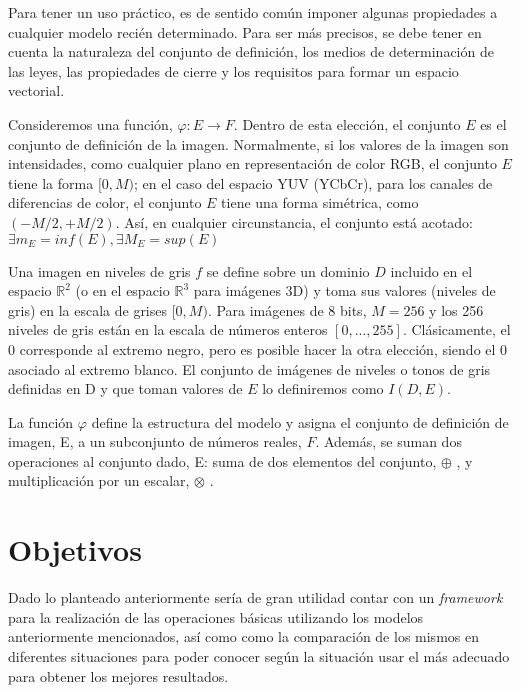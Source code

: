 Para tener un uso práctico, es de sentido común imponer algunas propiedades a cualquier modelo recién determinado. Para ser más precisos, se debe tener en cuenta la naturaleza del conjunto de definición, los medios de determinación de las leyes, las propiedades de cierre y los requisitos para formar un espacio vectorial. 

Consideremos una función, $\varphi : E \rightarrow F$. Dentro de esta elección, el conjunto $E$ es el conjunto de definición de la imagen. Normalmente, si los valores de la imagen son intensidades, como cualquier plano en representación de color RGB, el conjunto $E$ tiene la forma $[0,M)$; en el caso del espacio YUV (YCbCr), para los canales de diferencias de color, el conjunto $E$ tiene una forma simétrica, como $( - M/2 , + M/2 )$. Así, en cualquier circunstancia, el conjunto está acotado: $\exists m_E=inf(E),\exists M_E=sup(E)$

Una imagen en niveles de gris $f$ se define sobre un dominio $D$ incluido en el espacio $\mathbb{R}^2$ (o en el espacio $\mathbb{R}^3$  para imágenes 3D) y toma sus valores (niveles de gris) en la escala de grises $[0, M)$. Para imágenes de 8 bits, $ M = 256$ y los 256 niveles de gris están en la escala de números enteros $[0,..., 255]$. Clásicamente, el 0 corresponde al extremo negro, pero es posible hacer la otra elección, siendo el 0 asociado al extremo blanco. El conjunto de imágenes de niveles o tonos de gris definidas en D y que toman valores de $E$ lo definiremos como $I(D,E)$.

La función $\varphi$ define la estructura del modelo y asigna el conjunto de definición de imagen, E, a un subconjunto de números reales, $F$. Además, se suman dos operaciones al conjunto dado, E: suma de dos elementos del conjunto, $\oplus$ , y multiplicación por un escalar, $\otimes$ . 

\section*{Objetivos}

Dado lo planteado anteriormente ser\'ia de gran utilidad contar con un \textit{framework} para la realizaci\'on de las operaciones b\'asicas utilizando los modelos anteriormente mencionados, as\'i como como la comparaci\'on de los mismos en diferentes situaciones para poder conocer seg\'un la situaci\'on usar el m\'as adecuado para obtener los mejores resultados.

